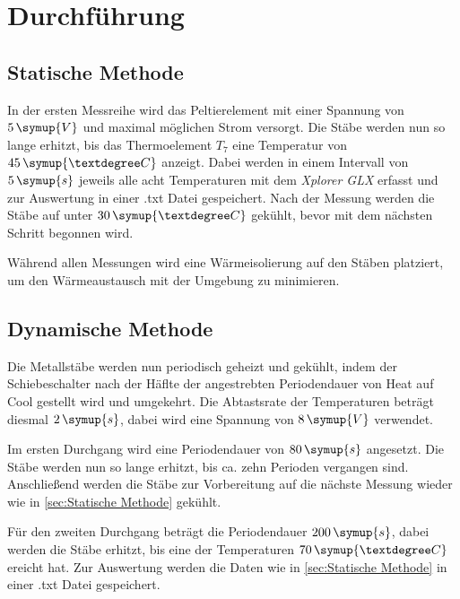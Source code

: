 \section{Durchführung}
\label{sec:Durchführung}

\subsection{Statische Methode}
\label{sec:Statische Methode}

In der ersten Messreihe wird das Peltierelement mit einer Spannung von $5\,\symup{V}$ und maximal möglichen Strom versorgt.
Die Stäbe werden nun so lange erhitzt, bis das Thermoelement $T_{7}$ eine Temperatur von $45\,\symup{°C}$ anzeigt.
Dabei werden in einem Intervall von $5\,\symup{s}$ jeweils alle acht Temperaturen mit dem \textit{Xplorer GLX}
erfasst und zur Auswertung in einer .txt Datei gespeichert.
Nach der Messung werden die Stäbe auf unter $30\,\symup{°C}$ gekühlt, bevor mit dem nächsten Schritt begonnen wird.

Während allen Messungen wird eine Wärmeisolierung auf den Stäben platziert, um den Wärmeaustausch mit der Umgebung zu minimieren.

\subsection{Dynamische Methode}
\label{sec:Dynamische Methode}

Die Metallstäbe werden nun periodisch geheizt und gekühlt, indem der Schiebeschalter nach der Häflte der angestrebten
Periodendauer von \glqq Heat\grqq{} auf \glqq Cool\grqq{} gestellt wird und umgekehrt.
Die Abtastsrate der Temperaturen beträgt diesmal $2\,\symup{s}$, dabei wird eine Spannung von $8\,\symup{V}$ verwendet.

Im ersten Durchgang wird eine Periodendauer von $80\,\symup{s}$ angesetzt. Die Stäbe werden nun so lange erhitzt,
bis ca. zehn Perioden vergangen sind.
Anschließend werden die Stäbe zur Vorbereitung auf die nächste Messung wieder wie in \autoref{sec:Statische Methode} gekühlt.

Für den zweiten Durchgang beträgt die Periodendauer $200\,\symup{s}$, dabei werden die Stäbe erhitzt, bis eine der Temperaturen
$70\,\symup{°C}$ ereicht hat. Zur Auswertung werden die Daten wie in \autoref{sec:Statische Methode} in einer .txt Datei gespeichert.